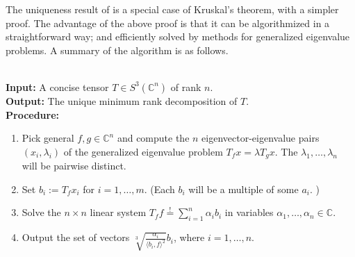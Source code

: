 The uniqueness result of is a special case of Kruskal's theorem, with a simpler proof. The advantage of the above proof is that it can be algorithmized in a straightforward way; and efficiently solved by methods for generalized eigenvalue problems.
A summary of the algorithm is as follows. 

\begin{algorithm}
	\label{tensorAlgorithms-algorithm-3tensor}
	~\\
	\textbf{Input: } A concise tensor $ T\in S^3(\mathbb C^n) $ of rank $ n $. \\
	\textbf{Output: } The unique minimum rank decomposition of $ T $. \\
	\textbf{Procedure: } \\
	\begin{enumerate}
		\item Pick general $ f, g\in \mathbb{C}^n $ and compute the $ n $ eigenvector-eigenvalue pairs $ (x_i, \lambda_i) $ of the generalized eigenvalue problem $ T_{f}x = \lambda T_{g}x $. The $ \lambda_1,\ldots,\lambda_n $ will be pairwise distinct. 
		\item Set $ b_i := T_fx_i $ for $ i = 1,\ldots,m $.	(Each $ b_i $ will be a multiple of some $ a_i $. )
		\item Solve the $ n\times n $ linear system $ T_f f \stackrel{!}{=} \sum_{i = 1}^{n} \alpha_i b_i $ in variables $ \alpha_1,\ldots,\alpha_n\in \mathbb{C} $. 
		\item Output the set of vectors $ \sqrt[3]{\frac{\alpha_i}{\langle b_i, f \rangle^2}} b_i $, where $ i = 1,\ldots,n $. 
	\end{enumerate}
\end{algorithm}

